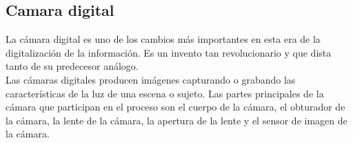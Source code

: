 \subsection{Camara digital}
La cámara digital es uno de los cambios más importantes en esta era de la digitalización
de la información. Es un invento tan revolucionario y que dista tanto de su predecesor
análogo.\\
Las cámaras digitales producen imágenes capturando o grabando las características de
la luz de una escena o sujeto. Las partes principales de la cámara que participan en
el proceso son el cuerpo de la cámara, el obturador de la cámara, la lente de la cámara,
la apertura de la lente y el sensor de imagen de la cámara.
~\cite{easybasicphotography}

